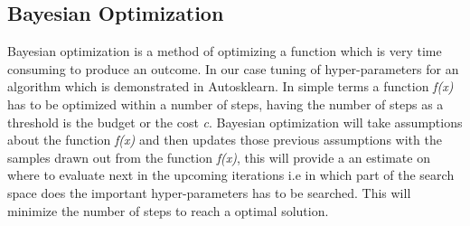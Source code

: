 \subsection{Bayesian Optimization}

Bayesian optimization is a method of optimizing a function which is very time consuming to produce an outcome. In our case tuning of hyper-parameters for an algorithm which is demonstrated in Autosklearn\cite{autosklearn}. In simple terms a function \textit{f(x)} has to be optimized within a number of steps, having the number of steps as a threshold is the budget or the cost \textit{c}. Bayesian optimization will take assumptions about the function \textit{f(x)} and then updates those previous assumptions with the samples drawn out from the function \textit{f(x)}, this will provide a an estimate on where to evaluate next in the upcoming iterations i.e in which part of the search space does the important hyper-parameters has to be searched. This will minimize the number of steps to reach a optimal solution.